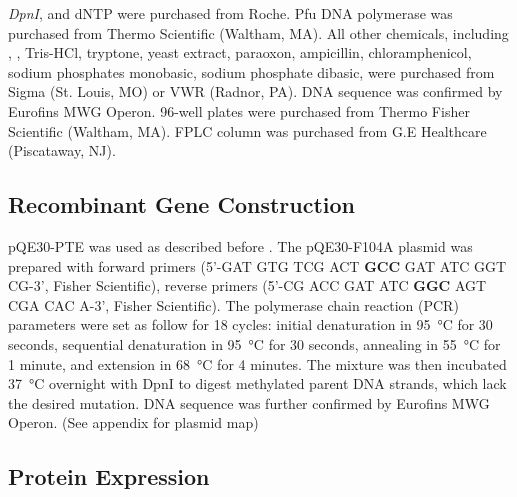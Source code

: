 \begin{refsection}
\emph{DpnI}, and dNTP were purchased from Roche.  Pfu DNA polymerase was
purchased from Thermo Scientific (Waltham, MA). All other chemicals, including
, , Tris-HCl, tryptone, yeast extract, paraoxon, ampicillin,
chloramphenicol, sodium phosphates monobasic, sodium phosphate dibasic, were
purchased from Sigma (St. Louis, MO) or VWR (Radnor, PA). DNA sequence was
confirmed by Eurofins MWG Operon.  96-well plates were purchased from Thermo
Fisher Scientific (Waltham, MA). FPLC column was purchased from G.E Healthcare
(Piscataway, NJ). 

\subsection{Recombinant Gene Construction}

pQE30-PTE was used as described before \cite{Baker2011b}. The pQE30-F104A plasmid
was prepared with forward primers (5\rq-GAT GTG TCG ACT \textbf{GCC} GAT ATC GGT
CG-3\rq, Fisher Scientific), reverse primers (5\rq-CG ACC GAT ATC \textbf{GGC} AGT
CGA CAC A-3\rq, Fisher Scientific). The polymerase chain reaction (PCR)
parameters were set as follow for 18 cycles: initial denaturation in
\SI{95}{\celsius} for 30 seconds, sequential denaturation in \SI{95}{\celsius}
for 30 seconds, annealing in \SI{55}{\celsius} for 1 minute, and extension in
\SI{68}{\celsius} for 4 minutes. The mixture was then incubated
\SI{37}{\celsius} overnight with DpnI to digest methylated parent DNA strands,
which lack the desired mutation. DNA sequence was further confirmed by Eurofins
MWG Operon. (See appendix for plasmid map)

\subsection{Protein Expression}
\label{sec:protein-expression-method}


\end{refsection}
